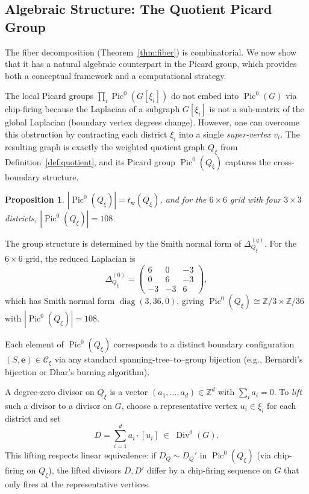 \documentclass[11pt]{article}
\newtheorem{proposition}{Proposition}[section]
\newcommand{\Z}{\mathbb{Z}}
\newcommand{\Pic}{\operatorname{Pic}^0}
\newcommand{\Div}{\operatorname{Div}^0}
\newcommand{\tw}{t_{\mathrm{w}}}
\begin{document}
\subsection{Algebraic Structure: The Quotient Picard Group}\label{sec:picard-quotient}

The fiber decomposition (Theorem~\ref{thm:fiber}) is combinatorial.
We now show that it has a natural algebraic counterpart in the Picard group,
which provides both a conceptual framework and a computational strategy.

The local Picard groups
$\prod_i \Pic(G[\xi_i])$ do not embed into $\Pic(G)$ via chip-firing because
the Laplacian of a subgraph $G[\xi_i]$ is not a sub-matrix of the global
Laplacian (boundary vertex degrees change). However, one can overcome this
obstruction by contracting each district $\xi_i$ into a single
\emph{super-vertex} $v_i$. The resulting graph is exactly the weighted
quotient graph $Q_{\xi}$ from Definition~\ref{def:quotient}, and its Picard group
$\Pic(Q_{\xi})$ captures the cross-boundary structure.

\begin{proposition}\label{prop:quotient-picard}
$|\Pic(Q_{\xi})| = \tw(Q_{\xi})$, and for the $6 \times 6$ grid with four
$3 \times 3$ districts, $|\Pic(Q_{\xi})| = 108$.
\end{proposition}

The group structure is determined by the Smith normal form of
$\Delta_{Q_{\xi}}^{(q)}$. For the $6 \times 6$ grid, the reduced Laplacian is
\[
  \Delta_{Q_{\xi}}^{(0)} =
  \begin{pmatrix}
    6 & 0 & -3 \\
    0 & 6 & -3 \\
    -3 & -3 & 6
  \end{pmatrix},
\]
which has Smith normal form $\operatorname{diag}(3, 36, 0)$, giving
$\Pic(Q_{\xi}) \cong \Z/3 \times \Z/36$ with $|\Pic(Q_{\xi})| = 108$.

Each element of $\Pic(Q_{\xi})$ corresponds to a distinct boundary configuration
$(S, \mathbf{e}) \in \mathcal{C}_{\xi}$ via any standard spanning-tree--to--group
bijection (e.g., Bernardi's bijection or Dhar's burning algorithm).

A degree-zero divisor on $Q_{\xi}$ is a vector $(a_1, \ldots, a_d) \in \Z^d$
with $\sum_i a_i = 0$. To \emph{lift} such a divisor to a divisor on $G$,
choose a representative vertex $u_i \in \xi_i$ for each district and set
\[
  D = \sum_{i=1}^d a_i \cdot [u_i] \;\in\; \Div(G).
\]
This lifting respects linear equivalence: if $D_Q \sim D_Q'$ in $\Pic(Q_{\xi})$
(via chip-firing on $Q_{\xi}$), the lifted divisors $D, D'$ differ by a
chip-firing sequence on $G$ that only fires at the representative vertices.
\end{document}
